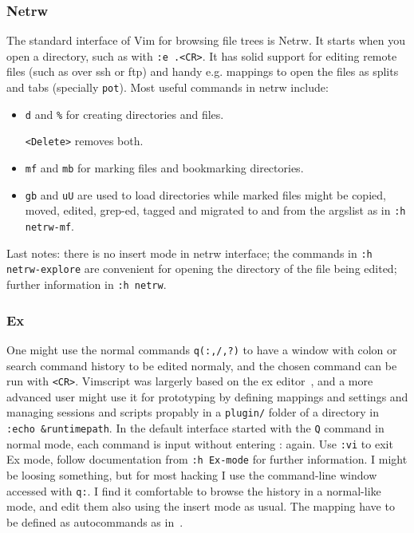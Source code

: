 \documentclass{article}
\newcommand{\ttt}[1] {
	\texttt{<#1>}}
\newcommand{\tttt}[1]{\texttt{#1}}
\begin{document}
\subsubsection{Netrw}\label{netrw}
The standard interface of Vim for browsing file trees is Netrw.
It starts when you open a directory, such as with \tttt{:e .<CR>}.
It has solid support for editing remote files (such as over ssh or
ftp) and handy e.g. mappings to open the files as splits and tabs (specially \tttt{pot}).
Most useful commands in netrw include:
\begin{itemize}
  \item \tttt{d} and \tttt{\%} for creating directories and files.
    \ttt{Delete} removes both.
  \item \tttt{mf} and \tttt{mb} for marking files and bookmarking directories.
  \item \tttt{gb} and \tttt{uU} are used to load directories
    while marked files might be copied, moved, edited, grep-ed, tagged and migrated
    to and from the argslist as in \tttt{:h netrw-mf}.
\end{itemize}
Last notes:
there is no insert mode in netrw interface;
the commands in \tttt{:h netrw-explore} are
convenient for opening the directory of the
file being edited;
further information in \tttt{:h netrw}.

\subsubsection{Ex}
One might use the normal commands \tttt{q(:,/,?)} to have a window
with colon or search command history to be edited normaly,
and the chosen command can be run with \ttt{CR}.
Vimscript was largerly based on the ex editor~\cite{ex},
and a more advanced user might use it for prototyping
by defining mappings and settings and managing sessions and scripts
propably in a \tttt{plugin/} folder of a directory in \tttt{:echo \&runtimepath}.
In the default interface started with the \tttt{Q} command in normal mode,
each command is input without entering : again. Use \tttt{:vi} to exit Ex mode,
follow documentation from \tttt{:h Ex-mode} for further information.
I might be loosing something, but for most
hacking I use the command-line window accessed with \tttt{q:}.
I find it comfortable to browse the history in a normal-like mode,
and edit them also using the insert mode as usual.
The mapping have to be defined as autocommands as in~\cite{vimrc}.
\end{document}
